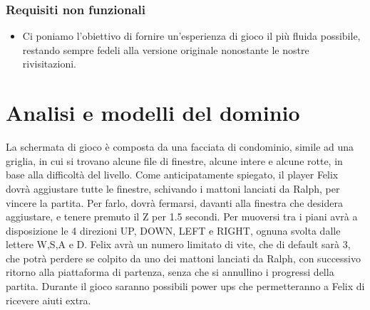 \documentclass[a4paper,12pt]{report}
\begin{document}
\subsubsection{Requisiti non funzionali}
\begin{itemize}
	\item Ci poniamo l'obiettivo di fornire un'esperienza di gioco il più fluida possibile, restando sempre fedeli alla versione originale nonostante le nostre rivisitazioni.
\end{itemize}

\section{Analisi e modelli del dominio}
La schermata di gioco è composta da una facciata di condominio, simile ad una griglia, in cui si trovano alcune file di finestre, alcune intere e alcune rotte, in base alla difficoltà del livello.
Come anticipatamente spiegato, il player Felix dovrà aggiustare tutte le finestre, schivando i mattoni lanciati da Ralph, per vincere la partita.
Per farlo, dovrà fermarsi, davanti alla finestra che desidera aggiustare, e tenere premuto il Z per 1.5 secondi. 
Per muoversi tra i piani avrà a disposizione le 4 direzioni UP, DOWN, LEFT e RIGHT, ognuna svolta dalle lettere W,S,A e D.
Felix avrà un numero limitato di vite, che di default sarà 3, che potrà perdere se colpito da uno dei mattoni lanciati da Ralph, con successivo ritorno alla piattaforma di partenza, senza che si annullino i progressi della partita.
Durante il gioco saranno possibili power ups che permetteranno a Felix di ricevere aiuti extra.
\end{document}
